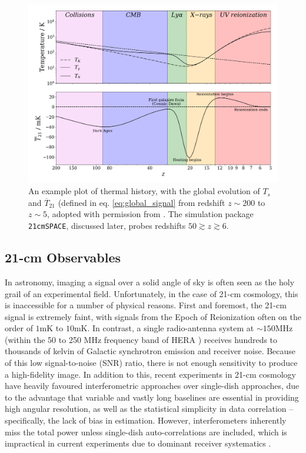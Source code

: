 \documentclass[floats,floatfix,showpacs,amssymb,prd,superscriptaddress,nofootinbib]{revtex4-2} %
\newcommand{\code}{\texttt}
\newcommand{\red}{\textcolor{red}}
\begin{document}
\begin{figure}[H]
    \centering
    \includegraphics[width=0.85\columnwidth]{images/Example21cm.png}
    \caption{An example plot of thermal history, with the global evolution of $T_s$ and $\overline{T}_{21}$ (defined in eq. \ref{eq:global_signal} from redshift $z \sim 200$ to $z \sim 5$, adopted with permission from \citet{dhandha_2022}. The simulation package \code{21cmSPACE}, discussed later, probes redshifts $50 \gtrsim z \gtrsim 6$.}
    \label{fig:example_21cm}
\end{figure}

\subsection{21-cm Observables}

In astronomy, imaging a signal over a solid angle of sky is often seen as the holy grail of an experimental field. Unfortunately, in the case of 21-cm cosmology, this is inaccessible for a number of physical reasons. First and foremost, the 21-cm signal is extremely faint, with signals from the Epoch of Reionization often on the order of $1 \text{mK}$ to $10 \text{mK}$.
In contrast, a single radio-antenna system at  $\sim 150 \text{MHz}$ (within the 50 to 250 MHz frequency band of HERA \citep{DeBoer_2017}) receives hundreds to thousands of kelvin of Galactic synchrotron emission and receiver noise. Because of this low signal-to-noise (SNR) ratio, there is not enough sensitivity to produce a high-fidelity image. In addition to this, recent experiments in 21-cm cosmology have heavily favoured interferometric approaches over single-dish approaches, due to the advantage that variable and vastly long baselines are essential in providing high angular resolution, as well as the statistical simplicity in data correlation -- specifically, the lack of bias in estimation. However, interferometers inherently miss the total power unless single-dish auto-correlations are included, which is impractical in current experiments due to dominant receiver systematics \citep{Liu_Shaw_2020}.
\end{document}
